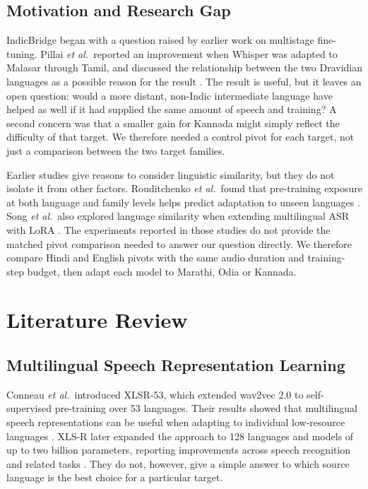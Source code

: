 \documentclass[conference]{IEEEtran}
\begin{document}
\subsection{Motivation and Research Gap}

IndicBridge began with a question raised by earlier work on multistage
fine-tuning. Pillai \emph{et al.}\ reported an improvement when Whisper
was adapted to Malasar through Tamil, and discussed the relationship
between the two Dravidian languages as a possible reason for the result
\cite{pillai2026multistage}. The result is useful, but it leaves an open
question: would a more distant, non-Indic intermediate language have helped as well
if it had supplied the same amount of speech and training? A second
concern was that a smaller gain for Kannada might simply reflect the
difficulty of that target. We therefore needed a control pivot for each
target, not just a comparison between the two target families.

Earlier studies give reasons to consider linguistic similarity, but they
do not isolate it from other factors. Rouditchenko \emph{et al.}\ found
that pre-training exposure at both language and family levels helps
predict adaptation to unseen languages \cite{rouditchenko2023unseen}.
Song \emph{et al.}\ also explored language similarity when extending
multilingual ASR with LoRA \cite{song2024lorawhisper}. The experiments
reported in those studies do not provide the matched pivot comparison
needed to answer our question directly. We therefore compare Hindi and
English pivots with the same audio duration and training-step budget,
then adapt each model to Marathi, Odia or Kannada.

\section{Literature Review}

\subsection{Multilingual Speech Representation Learning}

Conneau \emph{et al.}\ introduced XLSR-53, which extended wav2vec 2.0 to
self-supervised pre-training over 53 languages. Their results showed that
multilingual speech representations can be useful when adapting to
individual low-resource languages \cite{conneau2021xlsr}. XLS-R later
expanded the approach to 128 languages and models of up to two billion
parameters, reporting improvements across speech recognition and related
tasks \cite{babu2022xlsr}. They do not, however, give a simple answer to
which source language is the best choice for a particular target.
\end{document}

